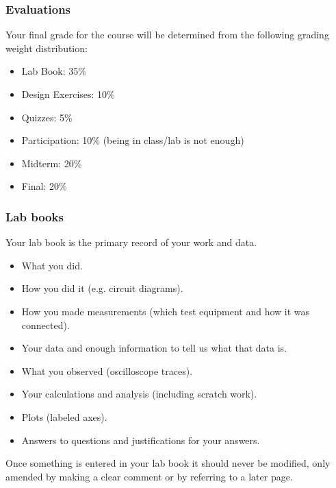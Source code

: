 \documentclass[beamer]{standalone}
\begin{document}
\begin{frame}
\frametitle{Evaluations}
Your final grade for the course will be determined from the following grading weight distribution:

\begin{itemize}
\item Lab Book:   35\%
\item Design Exercises:  10\%
\item Quizzes:  5\%
\item Participation:  10\%  (\alert{being in class/lab is not enough})
\item Midterm:   20\%
\item Final:   20\%
\end{itemize}
\end{frame}


\begin{frame}
\frametitle{Lab books}
Your lab book is \alert{the primary record of your work and data}.  

\begin{itemize}
 \item What you did.
 \item How you did it (e.g. circuit diagrams).
 \item How you made measurements (which test equipment and how it was connected).
 \item Your data and enough information to tell us what that data is.
 \item What you observed (oscilloscope traces).
 \item Your calculations and analysis (including scratch work). 
 \item Plots (labeled axes).
 \item Answers to questions and justifications for your answers.
\end{itemize}

Once something is entered in your lab book it should never be modified, only amended by making a clear comment or by referring to a later page.
\end{frame}
\end{document}
